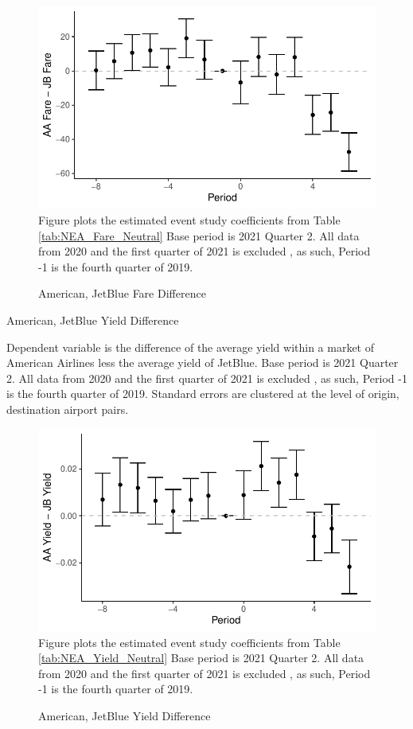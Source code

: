 \documentclass{article}
\begin{document}
\begin{appendices}
	\begin{figure}
		\caption{American, JetBlue Fare Difference}
		\label{fig:NEA_Fare_Neutral}
		\includegraphics[width = \linewidth]{NEA_Price_Neutrality_Graph}
		\footnotesize{Figure plots the estimated event study coefficients from Table \ref{tab:NEA_Fare_Neutral} Base period is 2021 Quarter 2. All data from 2020 and the first quarter of 2021 is excluded , as such,  Period -1 is the fourth quarter of 2019.}
	\end{figure}
	
	\begin{table}
		\caption{American, JetBlue Yield Difference}
		\label{tab:NEA_Yield_Neutral}
		
		\footnotesize{Dependent variable is the difference of the average yield within a market of American Airlines less the average yield of JetBlue. Base period is 2021 Quarter 2. All data from 2020 and the first quarter of 2021 is excluded , as such,  Period -1 is the fourth quarter of 2019. Standard errors are clustered at the level of origin, destination airport pairs.}
	\end{table}
	
	\begin{figure}
		\caption{American, JetBlue Yield Difference}
		\label{fig:NEA_Yield_Neutral}
		\includegraphics[width = \linewidth]{NEA_Price_Neutrality_Graph_Y}
		\footnotesize{Figure plots the estimated event study coefficients from Table \ref{tab:NEA_Yield_Neutral} Base period is 2021 Quarter 2. All data from 2020 and the first quarter of 2021 is excluded , as such,  Period -1 is the fourth quarter of 2019.}
	\end{figure}
	

\end{appendices}
\end{document}
